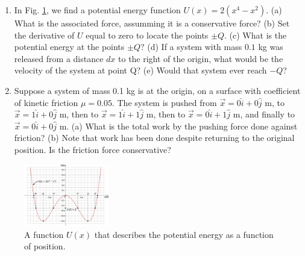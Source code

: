 \documentclass{article}
\begin{document}
\begin{enumerate}
\item In Fig. \ref{fig:1}, we find a potential energy function $U(x) = 2(x^4 - x^2)$. (a) What is the associated force, assumming it is a conservative force? (b) Set the derivative of $U$ equal to zero to locate the points $\pm Q$. (c) What is the potential energy at the points $\pm Q$? (d) If a system with mass $0.1$ kg was released from a distance $dx$ to the right of the origin, what would be the velocity of the system at point Q?  (e) Would that system ever reach $-Q$? \\ \vspace{1.5cm}
\item Suppose a system of mass 0.1 kg is at the origin, on a surface with coefficient of kinetic friction $\mu = 0.05$.  The system is pushed from $\vec{x} = 0\hat{i}+0\hat{j}$ m, to $\vec{x} = 1\hat{i}+0\hat{j}$ m, then to $\vec{x} = 1\hat{i} + 1\hat{j}$ m, then to $\vec{x} = 0\hat{i} + 1\hat{j}$ m, and finally to $\vec{x} = 0\hat{i}+0\hat{j}$ m.  (a) What is the total work by the pushing force done against friction?  (b) Note that work has been done despite returning to the original position.  Is the friction force conservative?
\end{enumerate}

\begin{figure}[hb]
\centering
\includegraphics[width=0.33\textwidth]{figures/PE.jpeg}
\caption{\label{fig:1} A function $U(x)$ that describes the potential energy as a function of position.}
\end{figure}
\end{document}
